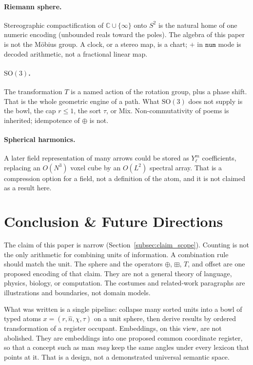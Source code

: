 \documentclass[12pt, a4paper]{article}
\begin{document}
\paragraph{Riemann sphere.}
Stereographic compactification of $\mathbb{C}\cup\{\infty\}$ onto $S^2$
is the natural home of one numeric encoding (unbounded reals toward the
poles). The algebra of this paper is not the M\"obius group. A clock,
or a stereo map, is a chart; $+$ in $\mathtt{num}$ mode is decoded
arithmetic, not a fractional linear map.

\paragraph{$\mathrm{SO}(3)$.}
The transformation $T$ is a named action of the rotation group, plus a
phase shift. That is the whole geometric engine of a path. What
$\mathrm{SO}(3)$ does not supply is the bowl, the cap $r\le 1$, the
sort $\tau$, or Mix. Non-commutativity of poems is inherited;
idempotence of $\oplus$ is not.

\paragraph{Spherical harmonics.}
A later field representation of many arrows could be stored as
$Y_\ell^m$ coefficients, replacing an $O(N^3)$ voxel cube by an
$O(L^2)$ spectral array. That is a compression option for a field, not
a definition of the atom, and it is not claimed as a result here.

\section{Conclusion \& Future Directions}
\label{sec:conclusion}

The claim of this paper is narrow
(Section~\ref{subsec:claim_scope}). Counting is not the only
arithmetic for combining units of information. A combination rule
should match the unit. The sphere and the operators
$\oplus$, $\boxplus$, $T$, and offset are one proposed encoding of
that claim. They are not a general theory of language, physics,
biology, or computation. The costumes and related-work paragraphs
are illustrations and boundaries, not domain models.

What was written is a single pipeline: collapse many sorted units
into a bowl of typed atoms $x=(r,\hat n,\chi,\tau)$ on a unit sphere,
then derive results by ordered transformation of a register occupant.
Embeddings, on this view, are
not abolished. They are embeddings into one proposed common coordinate
register, so that a
concept such as $\mathrm{man}$ \emph{may} keep the same angles under every
lexicon that points at it. That is a design, not a demonstrated
universal semantic space.
\end{document}

